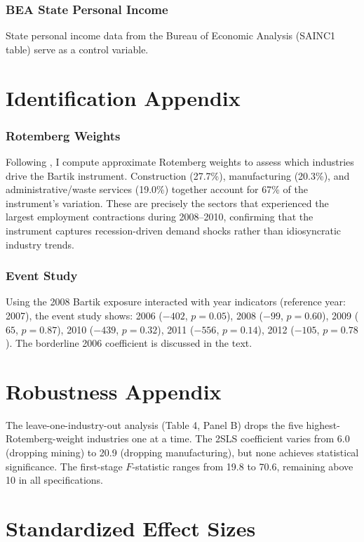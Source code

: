 \documentclass[12pt]{article}
\begin{document}
\subsubsection*{BEA State Personal Income} State personal income data from the Bureau of Economic Analysis (SAINC1 table) serve as a control variable.

\section{Identification Appendix}

\subsubsection*{Rotemberg Weights} Following \citet{goldsmithpinkham2020}, I compute approximate Rotemberg weights to assess which industries drive the Bartik instrument. Construction (27.7\%), manufacturing (20.3\%), and administrative/waste services (19.0\%) together account for 67\% of the instrument's variation. These are precisely the sectors that experienced the largest employment contractions during 2008--2010, confirming that the instrument captures recession-driven demand shocks rather than idiosyncratic industry trends.

\subsubsection*{Event Study} Using the 2008 Bartik exposure interacted with year indicators (reference year: 2007), the event study shows: 2006 ($-402$, $p = 0.05$), 2008 ($-99$, $p = 0.60$), 2009 ($65$, $p = 0.87$), 2010 ($-439$, $p = 0.32$), 2011 ($-556$, $p = 0.14$), 2012 ($-105$, $p = 0.78$). The borderline 2006 coefficient is discussed in the text.

\section{Robustness Appendix}

The leave-one-industry-out analysis (Table 4, Panel B) drops the five highest-Rotemberg-weight industries one at a time. The 2SLS coefficient varies from 6.0 (dropping mining) to 20.9 (dropping manufacturing), but none achieves statistical significance. The first-stage $F$-statistic ranges from 19.8 to 70.6, remaining above 10 in all specifications.

\section{Standardized Effect Sizes}
\label{sec:sde}


\end{document}
